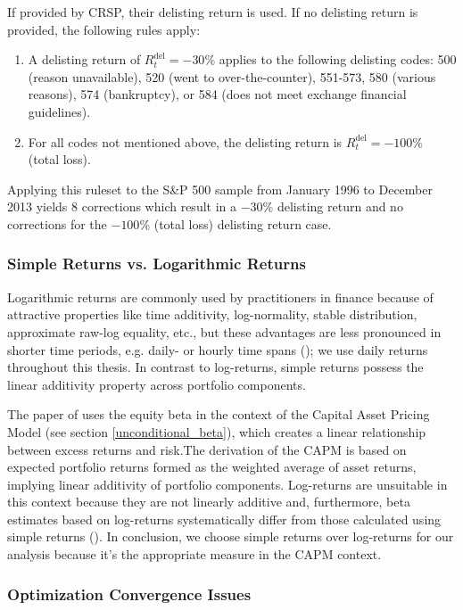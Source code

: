 \documentclass[11pt,a4paper]{article}
\def \indexName {S\&P 500}
\def \periodFrom {January 1996}
\def \periodTo {December 2013}
\begin{document}
If provided by CRSP, their delisting return is used. If no delisting return is provided, the following rules apply:
\begin{enumerate}
\item A delisting return of $R_t^\textrm{del} = -30\%$ applies to the following delisting codes: 500 (reason unavailable), 520 (went to over-the-counter), 551-573, 580 (various reasons), 574 (bankruptcy), or 584 (does not meet exchange financial guidelines).
\item For all codes not mentioned above, the delisting return is $R_t^\textrm{del} = -100\%$ (total loss).
\end{enumerate}

Applying this ruleset to the  \indexName{} sample from \periodFrom{} to \periodTo{} yields $8$ corrections which result in a $-30\%$ delisting return and no corrections for the $-100\%$ (total loss) delisting return case.



\subsubsection{Simple Returns vs. Logarithmic Returns}

Logarithmic returns are commonly used by practitioners in finance because of attractive properties like time additivity, log-normality, stable distribution, approximate raw-log equality, etc., but these advantages are less pronounced in shorter time periods, e.g. daily- or hourly time spans (); we use daily returns throughout this thesis. In contrast to log-returns, simple returns possess the linear additivity property across portfolio components.

The paper of  uses the equity beta in the context of the Capital Asset Pricing Model (see section \ref{unconditional_beta}), which creates a linear relationship between excess returns and risk.The derivation of the CAPM is based on expected portfolio returns formed as the weighted average of asset returns, implying linear additivity of portfolio components. Log-returns are unsuitable in this context because they are not linearly additive and, furthermore, beta estimates based on log-returns systematically differ from those calculated using simple returns (). In conclusion, we choose simple returns over log-returns for our analysis because it's the appropriate measure in the CAPM context.



\subsubsection{Optimization Convergence Issues}
\end{document}

